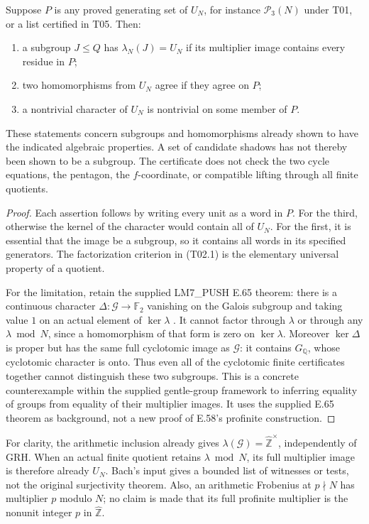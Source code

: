 Suppose $P$ is any proved generating set of $U_N$, for instance
$\mathcal P_3(N)$ under T01, or a list certified in T05. Then:
\begin{enumerate}
\item a subgroup $J\leq Q$ has $\lambda_N(J)=U_N$ if its multiplier
image contains every residue in $P$;
\item two homomorphisms from $U_N$ agree if they agree on $P$;
\item a nontrivial character of $U_N$ is nontrivial on some member of $P$.
\end{enumerate}
These statements concern subgroups and homomorphisms already shown to
have the indicated algebraic properties. A set of candidate shadows
has not thereby been shown to be a subgroup. The certificate does not
check the two cycle equations, the pentagon, the $f$-coordinate, or
compatible lifting through all finite quotients.

\begin{proof}
Each assertion follows by writing every unit as a word in $P$. For
the third, otherwise the kernel of the character would contain all of
$U_N$. For the first, it is essential that the image be a subgroup,
so it contains all words in its specified generators. The factorization
criterion in (T02.1) is the elementary universal property of a quotient.

For the limitation, retain the supplied LM7\_PUSH E.65 theorem:
there is a continuous character $\Delta:\mathcal G\to\mathbb F_2$
vanishing on the Galois subgroup and taking value $1$ on an actual
element of $\ker\lambda$ \cite[E.58, E.65]{LM7run}. It cannot factor
through $\lambda$ or through any $\lambda\bmod N$, since a homomorphism
of that form is zero on $\ker\lambda$. Moreover $\ker\Delta$ is proper
but has the same full cyclotomic image as $\mathcal G$: it contains
$G_{\mathbb Q}$, whose cyclotomic character is onto. Thus even all of
the cyclotomic finite certificates together cannot distinguish these
two subgroups. This is a concrete counterexample within the supplied
gentle-group framework to inferring equality of groups from equality
of their multiplier images. It uses the supplied E.65 theorem as
background, not a new proof of E.58's profinite construction.
\end{proof}

For clarity, the arithmetic inclusion already gives
$\lambda(\mathcal G)=\widehat{\mathbb Z}^{\times}$, independently of
GRH. When an actual finite quotient retains $\lambda\bmod N$, its
full multiplier image is therefore already $U_N$. Bach's input gives
a bounded list of witnesses or tests, not the original surjectivity
theorem. Also, an arithmetic Frobenius at $p\nmid N$ has multiplier
$p$ modulo $N$; no claim is made that its full profinite multiplier
is the nonunit integer $p$ in $\widehat{\mathbb Z}$.

